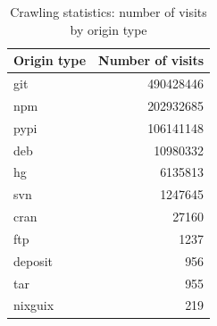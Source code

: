 \begin{table}
  \caption{Crawling statistics: number of visits by origin type}
  \label{tab:visits-by-type}
  \centering
  \begin{tabular}{l|r}
    \textbf{Origin type} & \textbf{Number of visits}
    \\\hline
    git     & \num{490428446} \\
    npm     & \num{202932685} \\
    pypi    & \num{106141148} \\
    deb     &  \num{10980332} \\
    hg      &   \num{6135813} \\
    svn     &   \num{1247645} \\
    cran    &     \num{27160} \\
    ftp     &      \num{1237} \\
    deposit &       \num{956} \\
    tar     &       \num{955} \\
    nixguix &       \num{219} \\
  \end{tabular}
\end{table}

